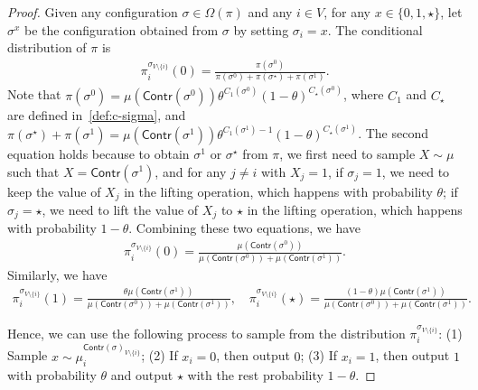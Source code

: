 \documentclass[11pt,a4paper]{article}
\theoremstyle{definition}
\begin{document}
\begin{proof}
Given any configuration $\sigma\in \Omega(\pi)$ and any $i \in V$, for any $x\in \{0,1,\star\}$, let $\sigma^x$ be the configuration obtained from $\sigma$ by setting $\sigma_i=x$.
The conditional distribution of $\pi$ is
\begin{align*}
\pi^{\sigma_{V \setminus \{i\}}}_i(0)=\frac{\pi(\sigma^0)}{\pi(\sigma^0)+\pi(\sigma^\star)+\pi(\sigma^1)}.
\end{align*}
Note that $\pi(\sigma^0) = \mu(\textsf{Contr}(\sigma^0)) \theta^{C_1(\sigma^0)}(1-\theta)^{C_\star(\sigma^0)}$, where $C_1$ and $C_\star$ are defined in~\eqref{def:c-sigma}, and $\pi(\sigma^\star) + \pi(\sigma^1) = \mu(\textsf{Contr}(\sigma^1)) \theta^{C_1(\sigma^1)-1}(1-\theta)^{C_\star(\sigma^1)}$. The second equation holds because to obtain $\sigma^1$ or $\sigma^\star$ from $\pi$, we first need to sample $X \sim \mu$ such that $X = \textsf{Contr}(\sigma^1)$, and for any $j \neq i$ with $X_j = 1$, if $\sigma_j = 1$, we need to keep the value of $X_j$ in the lifting operation, which happens with probability $\theta$; if $\sigma_j = \star$, we need to lift the value of $X_j$ to $\star$ in the lifting operation, which happens with probability $1-\theta$. Combining these two equations, we have 
\begin{align}\label{eq:pi-0-i}
    \pi^{\sigma_{V \setminus \{i\}}}_i(0) = \frac{\mu(\textsf{Contr}(\sigma^0))}{\mu(\textsf{Contr}(\sigma^0))+\mu(\textsf{Contr}(\sigma^1))}.
\end{align}
Similarly, we have 
\begin{align}\label{eq:pi-1-i}
    \pi^{\sigma_{V \setminus \{i\}}}_i(1) = \frac{\theta \mu(\textsf{Contr}(\sigma^1))}{\mu(\textsf{Contr}(\sigma^0))+\mu(\textsf{Contr}(\sigma^1))},\quad \pi^{\sigma_{V \setminus \{i\}}}_i(\star) =  \frac{(1-\theta)\mu(\textsf{Contr}(\sigma^1))}{\mu(\textsf{Contr}(\sigma^0))+\mu(\textsf{Contr}(\sigma^1))}.
\end{align}

Hence, we can use the following process to sample from the distribution $\pi^{\sigma_{V \setminus \{i\}}}_i$: (1) Sample $x \sim  \mu_i^{\textsf{Contr}(\sigma)_{V \setminus \{i\}}}$; (2) If $x_i = 0$, then output $0$; (3) If $x_i = 1$, then output $1$ with probability $\theta$ and output $\star$ with the rest probability $1-\theta$.


\end{proof}
\end{document}
